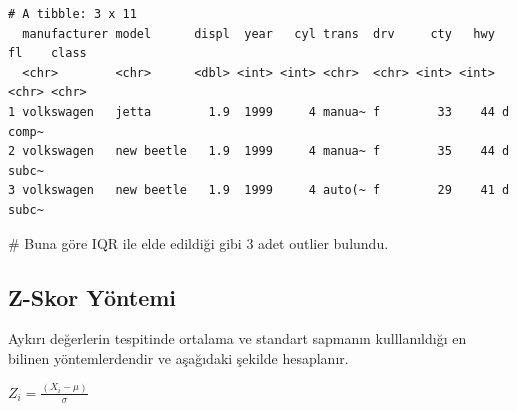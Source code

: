 \documentclass[
  letterpaper,
  DIV=11,
  numbers=noendperiod]{scrreprt}
\newenvironment{Shaded}{\begin{snugshade}}{\end{snugshade}}
\newcommand{\CommentTok}[1]{\textcolor[rgb]{0.37,0.37,0.37}{#1}}
\newcommand{\FloatTok}[1]{\textcolor[rgb]{0.68,0.00,0.00}{#1}}
\newcommand{\FunctionTok}[1]{\textcolor[rgb]{0.28,0.35,0.67}{#1}}
\newcommand{\NormalTok}[1]{\textcolor[rgb]{0.00,0.23,0.31}{#1}}
\newcommand{\OtherTok}[1]{\textcolor[rgb]{0.00,0.23,0.31}{#1}}
\newcommand{\SpecialCharTok}[1]{\textcolor[rgb]{0.37,0.37,0.37}{#1}}
\begin{document}
\begin{Shaded}
\end{Shaded}

\begin{verbatim}
# A tibble: 3 x 11
  manufacturer model      displ  year   cyl trans  drv     cty   hwy fl    class
  <chr>        <chr>      <dbl> <int> <int> <chr>  <chr> <int> <int> <chr> <chr>
1 volkswagen   jetta        1.9  1999     4 manua~ f        33    44 d     comp~
2 volkswagen   new beetle   1.9  1999     4 manua~ f        35    44 d     subc~
3 volkswagen   new beetle   1.9  1999     4 auto(~ f        29    41 d     subc~
\end{verbatim}

\begin{Shaded}
\begin{Highlighting}[]
\CommentTok{\# Buna göre IQR ile elde edildiği gibi 3 adet outlier bulundu.}
\end{Highlighting}
\end{Shaded}

\hypertarget{z-skor-yuxf6ntemi}{%
\subsection*{Z-Skor Yöntemi}\label{z-skor-yuxf6ntemi}}

Aykırı değerlerin tespitinde ortalama ve standart sapmanın kulllanıldığı
en bilinen yöntemlerdendir ve aşağıdaki şekilde hesaplanır.

\(Z_i = \frac{(X_i -\mu)}{\sigma}\)
\end{document}
